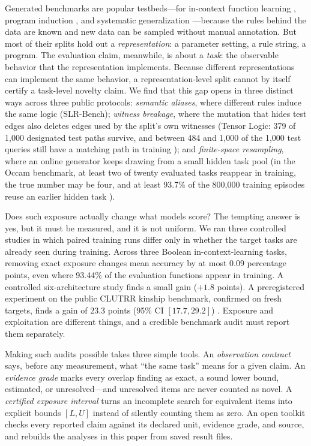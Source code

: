 \documentclass[twoside,11pt]{article}
\begin{document}
Generated benchmarks are popular testbeds---for in-context function
learning \citep{garg2022what,akyurek2023what,bhattamishra2024understanding},
program induction \citep{reed2016neural,zaremba2014learning}, and
systematic generalization \citep{lake2018generalization}---because the
rules behind the data are known and new data can be sampled without manual
annotation.  But most of their splits hold out a \emph{representation}: a
parameter setting, a rule string, a program.  The evaluation claim,
meanwhile, is about a \emph{task}: the observable behavior that the
representation implements.  Because different representations can implement
the same behavior, a representation-level split cannot by itself certify a
task-level novelty claim.  We find that this gap opens in three distinct
ways across three public protocols: \emph{semantic aliases}, where
different rules induce the same logic (SLR-Bench); \emph{witness breakage},
where the mutation that hides test edges also deletes edges used by the
split's own witnesses (Tensor Logic: 379 of 1,000 designated test paths
survive, and between 484 and 1,000 of the 1,000 test queries still have a
matching path in training \citep{shah2026tensorlogic}); and
\emph{finite-space resampling}, where an online generator keeps drawing
from a small hidden task pool (in the Occam benchmark, at least two of
twenty evaluated tasks reappear in training, the true number may be four,
and at least 93.7\% of the 800,000 training episodes reuse an earlier
hidden task \citep{deora2025occam}).

Does such exposure actually change what models score?  The tempting answer
is yes, but it must be measured, and it is not uniform.  We ran three
controlled studies in which paired training runs differ only in whether the
target tasks are already seen during training.  Across three Boolean
in-context-learning tasks, removing exact exposure changes mean accuracy by
at most 0.09 percentage points, even where 93.44\% of the evaluation
functions appear in training.  A controlled six-architecture study finds a
small gain ($+1.8$ points).  A preregistered experiment on the public
CLUTRR kinship benchmark, confirmed on fresh targets, finds a gain of
$23.3$ points (95\% CI $[17.7, 29.2]$) \citep{sinha2019clutrr}.  Exposure
and exploitation are different things, and a credible benchmark audit must
report them separately.

Making such audits possible takes three simple tools.  An
\emph{observation contract} says, before any measurement, what ``the same
task'' means for a given claim.  An \emph{evidence grade} marks every
overlap finding as exact, a sound lower bound, estimated, or
unresolved---and unresolved items are never counted as novel.  A
\emph{certified exposure interval} turns an incomplete search for
equivalent items into explicit bounds $[L, U]$ instead of silently counting
them as zero.  An open toolkit checks every reported claim against its
declared unit, evidence grade, and source, and rebuilds the analyses in
this paper from saved result files.
\end{document}

